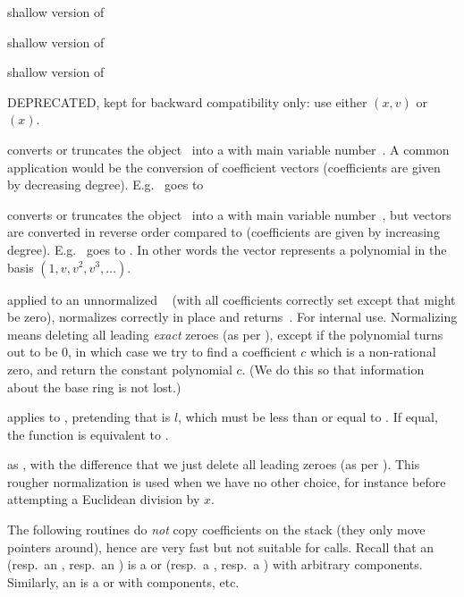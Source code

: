  shallow version of 

 shallow version of 

 shallow version of 

 DEPRECATED, kept for backward
compatibility only: use either $(x,v)$ or $(x)$.


 converts or truncates the object~
into a  with main variable number~. A common application
would be the conversion of coefficient vectors (coefficients are given by
decreasing degree). E.g.~\kbd{[2,3]} goes to 

 converts or truncates the object~
into a  with main variable number~, but vectors are converted
in reverse order compared to  (coefficients are given by
increasing degree). E.g.~\kbd{[2,3]} goes to . In other words
the vector represents a polynomial in the basis $(1,v,v^2,v^3,\dots)$.

 applied to an unnormalized ~
(with all coefficients correctly set except that  might
be zero), normalizes  correctly in place and returns~. For
internal use. Normalizing means deleting all leading \emph{exact} zeroes
(as per ), except if the polynomial turns out to be $0$,
in which case we try to find a coefficient $c$ which is a non-rational zero,
and return the constant polynomial $c$. (We do this so that information
about the base ring is not lost.)

 applies  to
, pretending that  is $l$, which must be less than
or equal to . If equal, the function is equivalent to
.

 as ,
with the difference that we just delete all leading zeroes (as per
). This rougher normalization is used when we have no other
choice, for instance before attempting a Euclidean division by $x$.

The following routines do \emph{not} copy coefficients on the stack (they
only move pointers around), hence are very fast but not suitable for
 calls. Recall that an  (resp.~an , resp.~an
) is a  or  (resp.~a , resp.~a )
with arbitrary components. Similarly, an  is a  or
 with  components, etc.

